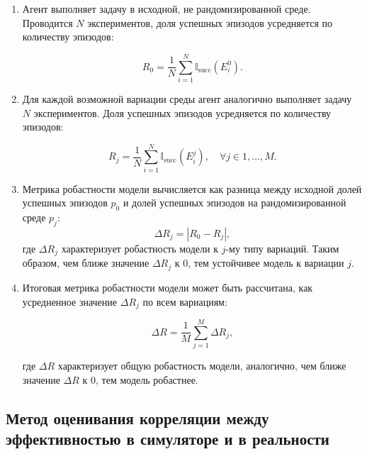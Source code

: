         \begin{enumerate}
            \item Агент выполняет задачу в исходной, не рандомизированной среде. Проводится $N$ экспериментов, доля успешных эпизодов усредняется по количеству эпизодов:

            \begin{equation}
                R_0 = \frac{1}{N} \sum_{i=1}^N \mathbb{I}_{\text{succ}}(E^0_i).
            \end{equation}

            \item Для каждой возможной вариации среды агент аналогично выполняет задачу $N$ экспериментов. Доля успешных эпизодов усредняется по количеству эпизодов:

            \begin{equation}
                R_j = \frac{1}{N} \sum_{i=1}^N \mathbb{I}_{\text{succ}}(E^j_i), \quad \forall j \in {1, \dots, M}.
            \end{equation}

            \item Метрика робастности модели вычисляется как разница между исходной долей успешных эпизодов $p_0$ и долей успешных эпизодов на рандомизированной среде $p_j$:  
            \begin{equation}  
                \Delta R_j = |R_0 - R_j| ,
            \end{equation}  
            где $\Delta R_j$ характеризует робастность модели к $j$-му типу вариаций. Таким образом, чем ближе значение $\Delta R_j$ к $0$, тем устойчивее модель к вариации $j$.

            \item Итоговая метрика робастности модели может быть рассчитана, как усредненное значение $\Delta R_j$ по всем вариациям:

            \begin{equation}  
                \Delta R = \frac{1}{M} \sum_{j=1}^M \Delta R_j ,
            \end{equation}  

            где $\Delta R$ характеризует общую робастность модели, аналогично, чем ближе значение $\Delta R$ к $0$, тем модель робастнее.
            
        \end{enumerate}

    \subsection{Метод оценивания корреляции между эффективностью в симуляторе и в реальности}
       
